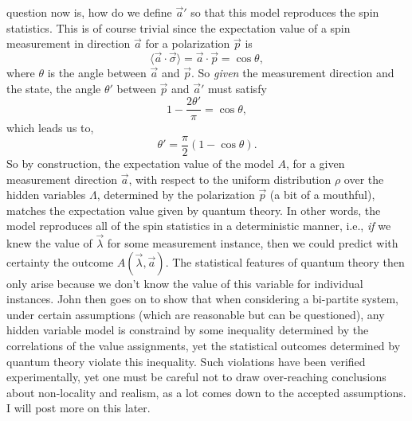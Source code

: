 \documentclass[a4paper]{article}
\begin{document}
    question now is, how do we define $\vec a'$ so that this
    model reproduces the spin statistics. This is of course
    trivial since the expectation value of a spin
    measurement in direction $\vec a$ for a polarization
    $\vec p$ is 
    \begin{equation}
        \langle \vec a \cdot \vec \sigma \rangle
        = \vec a \cdot \vec p
        = \cos\theta,
    \end{equation}
    where $\theta$ is the angle between $\vec a$ and $\vec
    p$. So \textit{given} the measurement direction and the
    state, the angle $\theta'$ between  $\vec p$ and $\vec
    a'$ must satisfy
    \begin{equation}
        1 - \frac{2\theta'}{\pi}
        = \cos\theta,
    \end{equation}
    which leads us to,
    \begin{equation}
        \theta'
        = \frac{\pi}{2}\left(1 - \cos\theta\right).
    \end{equation}
    So by construction, the expectation value of the model
    $A$, for a given measurement direction $\vec a$, with
    respect to the uniform distribution $\rho$ over the
    hidden variables $\Lambda$, determined by the
    polarization $\vec p$ (a bit of a mouthful), matches
    the expectation value given by quantum theory. In other
    words, the model reproduces all of the spin statistics
    in a deterministic manner, i.e., \textit{if} we knew the
    value of $\vec \lambda$ for some measurement instance,
    then we could predict with certainty the outcome $A(\vec
    \lambda, \vec a)$.  The statistical features of quantum
    theory then only arise because we don't know the value
    of this variable for individual instances. John then
    goes on to show that when considering a bi-partite
    system, under certain assumptions (which are reasonable
    but can be questioned), any hidden variable model is
    constraind by some inequality determined by the
    correlations of the value assignments, yet the
    statistical outcomes determined by quantum theory
    violate this inequality. Such violations have been
    verified experimentally, yet one must be careful not to
    draw over-reaching conclusions about non-locality and
    realism, as a lot comes down to the accepted
    assumptions. I will post more on this later.

        
\end{document}

